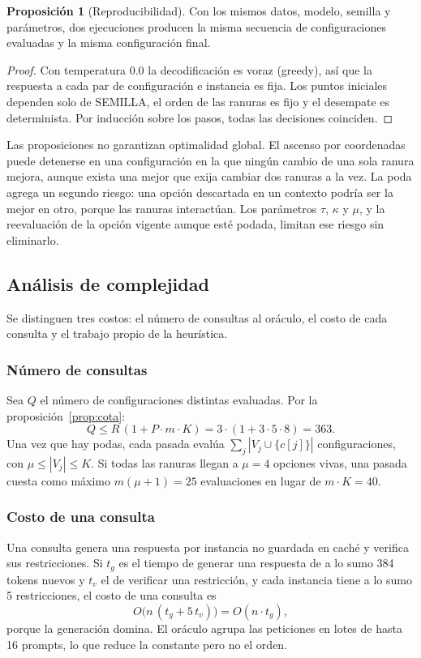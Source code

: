 \documentclass[12pt,letterpaper]{article}
\theoremstyle{definition}
\newtheorem{proposicion}{Proposición}
\begin{document}
\begin{proposicion}[Reproducibilidad]\label{prop:reproducible}
Con los mismos datos, modelo, semilla y parámetros, dos ejecuciones producen la misma secuencia de configuraciones evaluadas y la misma configuración final.
\end{proposicion}
\begin{proof}
Con temperatura 0.0 la decodificación es voraz (greedy), así que la respuesta a cada par de configuración e instancia es fija. Los puntos iniciales dependen solo de SEMILLA, el orden de las ranuras es fijo y el desempate es determinista. Por inducción sobre los pasos, todas las decisiones coinciden.
\end{proof}

Las proposiciones no garantizan optimalidad global. El ascenso por coordenadas puede detenerse en una configuración en la que ningún cambio de una sola ranura mejora, aunque exista una mejor que exija cambiar dos ranuras a la vez. La poda agrega un segundo riesgo: una opción descartada en un contexto podría ser la mejor en otro, porque las ranuras interactúan. Los parámetros $\tau$, $\kappa$ y $\mu$, y la reevaluación de la opción vigente aunque esté podada, limitan ese riesgo sin eliminarlo.

\subsection{Análisis de complejidad}
Se distinguen tres costos: el número de consultas al oráculo, el costo de cada consulta y el trabajo propio de la heurística.

\subsubsection{Número de consultas}
Sea $Q$ el número de configuraciones distintas evaluadas. Por la proposición~\ref{prop:cota}:
\[
Q \leq R\,(1 + P \cdot m \cdot K) = 3 \cdot (1 + 3 \cdot 5 \cdot 8) = 363.
\]
Una vez que hay podas, cada pasada evalúa $\sum_j |V_j \cup \{c[j]\}|$ configuraciones, con $\mu \leq |V_j| \leq K$. Si todas las ranuras llegan a $\mu = 4$ opciones vivas, una pasada cuesta como máximo $m(\mu + 1) = 25$ evaluaciones en lugar de $m \cdot K = 40$.

\subsubsection{Costo de una consulta}
Una consulta genera una respuesta por instancia no guardada en caché y verifica sus restricciones. Si $t_g$ es el tiempo de generar una respuesta de a lo sumo 384 tokens nuevos y $t_v$ el de verificar una restricción, y cada instancia tiene a lo sumo 5 restricciones, el costo de una consulta es
\[
O\big(n\,(t_g + 5\,t_v)\big) = O(n \cdot t_g),
\]
porque la generación domina. El oráculo agrupa las peticiones en lotes de hasta 16 prompts, lo que reduce la constante pero no el orden.
\end{document}
